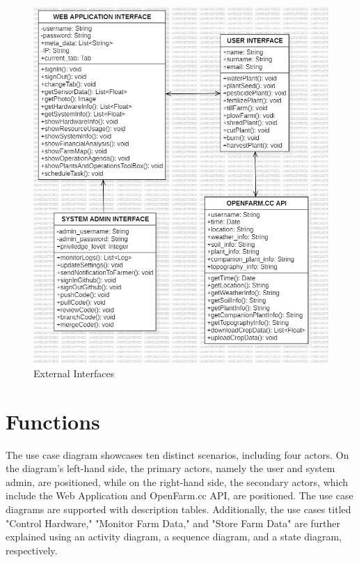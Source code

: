 \begin{figure}[htbp]
        \centering
        \includegraphics[width=1\linewidth]{Figures/external_interfaces.jpg}
        \caption{External Interfaces}
        \label{ExternalInterfaces}
\end{figure}

\newpage

\section{Functions}
The use case diagram showcases ten distinct scenarios, including four actors. On the diagram's left-hand side, the primary actors, namely the user and system admin, are positioned, while on the right-hand side, the secondary actors, which include the Web Application and OpenFarm.cc API, are positioned. The use case diagrams are supported with description tables. Additionally, the use cases titled "Control Hardware," "Monitor Farm Data," and "Store Farm Data" are further explained using an activity diagram, a sequence diagram, and a state diagram, respectively.\\

